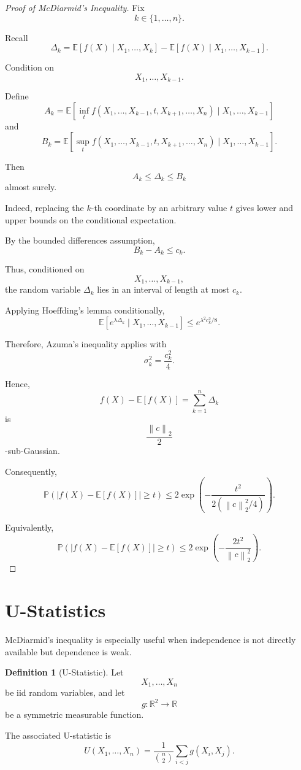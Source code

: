 \documentclass[12pt,oneside]{book}
\numberwithin{equation}{section}
\theoremstyle{definition}
\newtheorem{definition}{Definition}[section]
\theoremstyle{plain}
\theoremstyle{remark}
\newcommand{\R}{\mathbb{R}}
\newcommand{\E}{\mathbb{E}}
\newcommand{\Prob}{\mathbb{P}}
\newcommand{\norm}[1]{\left\lVert #1 \right\rVert}
\begin{document}
\begin{proof}[Proof of McDiarmid's Inequality]
Fix
\[
k\in\{1,\dots,n\}.
\]

Recall
\[
\Delta_k
=
\E[f(X)\mid X_1,\dots,X_k]
-
\E[f(X)\mid X_1,\dots,X_{k-1}].
\]

Condition on
\[
X_1,\dots,X_{k-1}.
\]

Define
\[
A_k
=
\E\left[
\inf_t
f(X_1,\dots,X_{k-1},t,X_{k+1},\dots,X_n)
\mid
X_1,\dots,X_{k-1}
\right]
\]
and
\[
B_k
=
\E\left[
\sup_t
f(X_1,\dots,X_{k-1},t,X_{k+1},\dots,X_n)
\mid
X_1,\dots,X_{k-1}
\right].
\]

Then
\[
A_k
\leq
\Delta_k
\leq
B_k
\]
almost surely.

Indeed, replacing the $k$-th coordinate by an arbitrary value $t$ gives lower and upper bounds on the conditional expectation.

By the bounded differences assumption,
\[
B_k-A_k
\leq
c_k.
\]

Thus, conditioned on
\[
X_1,\dots,X_{k-1},
\]
the random variable $\Delta_k$ lies in an interval of length at most $c_k$.

Applying Hoeffding's lemma conditionally,
\[
\E\left[
e^{\lambda\Delta_k}
\mid
X_1,\dots,X_{k-1}
\right]
\leq
e^{\lambda^2 c_k^2/8}.
\]

Therefore, Azuma's inequality applies with
\[
\sigma_k^2=\frac{c_k^2}{4}.
\]

Hence,
\[
f(X)-\E[f(X)]
=
\sum_{k=1}^n \Delta_k
\]
is
\[
\frac{\norm{c}_2}{2}
\]
-sub-Gaussian.

Consequently,
\[
\Prob\left(
|f(X)-\E[f(X)]|
\geq t
\right)
\leq
2\exp\left(
-\frac{t^2}{2(\norm{c}_2^2/4)}
\right).
\]

Equivalently,
\[
\Prob\left(
|f(X)-\E[f(X)]|
\geq t
\right)
\leq
2\exp\left(
-\frac{2t^2}{\norm{c}_2^2}
\right).
\]
\end{proof}

\section{U-Statistics}

McDiarmid's inequality is especially useful when independence is not directly available but dependence is weak.

\begin{definition}[U-Statistic]
Let
\[
X_1,\dots,X_n
\]
be iid random variables, and let
\[
g:\R^2\to\R
\]
be a symmetric measurable function.

The associated U-statistic is
\[
U(X_1,\dots,X_n)
=
\frac{1}{\binom{n}{2}}
\sum_{i<j} g(X_i,X_j).
\]
\end{definition}
\end{document}
